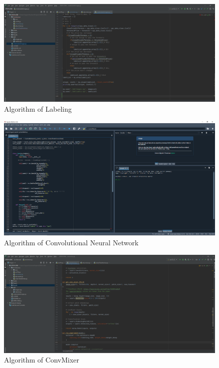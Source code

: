\documentclass[]{article}
\begin{document}
\begin{figure}[H]
\begin{center}
    \includegraphics[scale=0.155]{assets/appendix/image_creation_alg.png}
    \caption{Algorithm of Labeling}
\end{center}
\end{figure}
\noindent
\begin{figure}[H]
\begin{center}
    \includegraphics[scale=0.18]{assets/appendix/cnn_implemantation.png}
    \caption{Algorithm of Convolutional Neural Network}
\end{center}
\end{figure}
\noindent
\begin{figure}[H]
\begin{center}
    \includegraphics[scale=0.18]{assets/appendix/convmixer_implemantation.png}
    \caption{Algorithm of ConvMixer}
\end{center}
\end{figure}
\end{document}
